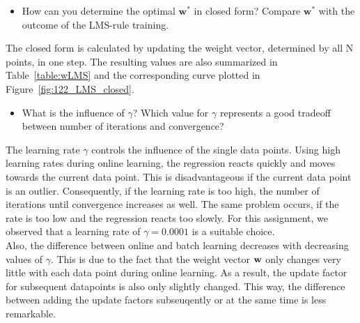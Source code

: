 \documentclass[a4]{article}
\begin{document}
\begin{itemize}
	\item How can you determine the optimal ${\mathbf w}^*$ in closed form? Compare ${\mathbf w}^*$ with the outcome of the LMS-rule training.
\end{itemize}
The closed form is calculated by updating the weight vector, determined by all N points, in one step. The resulting values are also summarized in Table~\ref{table:wLMS} and the corresponding curve plotted in Figure~\ref{fig:122_LMS_closed}.
\begin{itemize}	
	\item What is the influence of $\gamma$? Which value for $\gamma$ represents a good tradeoff between number of iterations and convergence? 
\end{itemize}
The learning rate $\gamma$ controls the influence of the single data points. Using high learning rates during online learning,  the regression reacts quickly and moves towards the current data point. This is disadvantageous if the current data point is an outlier. Consequently, if the learning rate is too high, the number of iterations until convergence increases as well. The same problem occurs, if the rate is too low and the regression reacts too slowly. For this assignment, we observed that a learning rate of $\gamma=0.0001$ is a suitable choice. \\
Also, the difference between online and batch learning decreases with decreasing values of $\gamma$. This is due to the fact that the weight vector $\bf{w}$ only changes very little with each data point during online learning. As a result, the update factor for subsequent datapoints is also only slightly changed. This way, the difference between adding the update factors subseuqently or at the same time is less remarkable. \\
\end{document}
